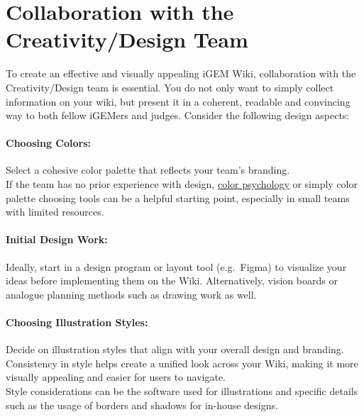 
\section{Collaboration with the Creativity/Design Team } \label{sec:2.1}
To create an effective and visually appealing iGEM Wiki, collaboration with the Creativity/Design team is essential.
You do not only want to simply collect information on your wiki, but present it in a coherent, readable and convincing way to both fellow iGEMers and judges.
Consider the following design aspects:

\paragraph{Choosing Colors:} Select a cohesive color palette that reflects your team’s branding.\\
If the team has no prior experience with design, \href{https://en.wikipedia.org/wiki/Color_psychology}{color psychology}\cite{colorpsychology} or simply color palette choosing tools can be a helpful starting point, especially in small teams with limited resources.
\paragraph{Initial Design Work:} Ideally, start in a design program or layout tool (e.g.\ Figma) to visualize your ideas before implementing them on the Wiki.
Alternatively, vision boards or analogue planning methods such as drawing work as well.
\paragraph{Choosing Illustration Styles:} Decide on illustration styles that align with your overall design and branding.
Consistency in style helps create a unified look across your Wiki, making it more visually appealing and easier for users to navigate. \\

Style considerations can be the software used for illustrations and specific details such as the usage of borders and shadows for in-house designs.
